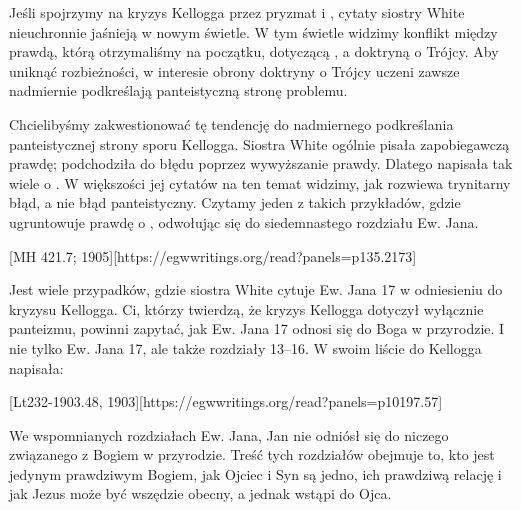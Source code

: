 
Jeśli spojrzymy na kryzys Kellogga przez pryzmat  i , cytaty siostry White nieuchronnie jaśnieją w nowym świetle. W tym świetle widzimy konflikt między prawdą, którą otrzymaliśmy na początku, dotyczącą , a doktryną o Trójcy. Aby uniknąć rozbieżności, w interesie obrony doktryny o Trójcy uczeni zawsze nadmiernie podkreślają panteistyczną stronę problemu.

Chcielibyśmy zakwestionować tę tendencję do nadmiernego podkreślania panteistycznej strony sporu Kellogga. Siostra White ogólnie pisała zapobiegawczą prawdę; podchodziła do błędu poprzez wywyższanie prawdy. Dlatego napisała tak wiele o . W większości jej cytatów na ten temat widzimy, jak rozwiewa trynitarny błąd, a nie błąd panteistyczny. Czytamy jeden z takich przykładów, gdzie ugruntowuje prawdę o , odwołując się do siedemnastego rozdziału Ew. Jana.

[MH 421.7; 1905][https://egwwritings.org/read?panels=p135.2173]

Jest wiele przypadków, gdzie siostra White cytuje Ew. Jana 17 w odniesieniu do kryzysu Kellogga. Ci, którzy twierdzą, że kryzys Kellogga dotyczył wyłącznie panteizmu, powinni zapytać, jak Ew. Jana 17 odnosi się do Boga w przyrodzie. I nie tylko Ew. Jana 17, ale także rozdziały 13--16. W swoim liście do Kellogga napisała:

[Lt232-1903.48, 1903][https://egwwritings.org/read?panels=p10197.57]

We wspomnianych rozdziałach Ew. Jana, Jan nie odniósł się do niczego związanego z Bogiem w przyrodzie. Treść tych rozdziałów obejmuje to, kto jest jedynym prawdziwym Bogiem, jak Ojciec i Syn są jedno, ich prawdziwą relację i jak Jezus może być wszędzie obecny, a jednak wstąpi do Ojca.

